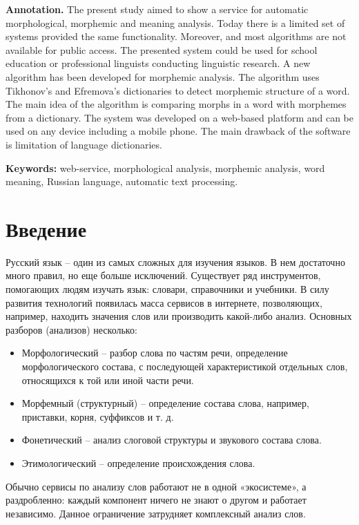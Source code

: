 \documentclass[a4paper,12pt]{article}
\begin{document}
\textbf{Annotation.} The present study aimed to show a service for automatic morphological, morphemic and meaning analysis. Today there is a limited set of systems provided the same functionality. Moreover, and most algorithms are not available for public access. The presented system could be used for school education or professional linguists conducting linguistic research. A new algorithm has been developed for morphemic analysis. The algorithm uses Tikhonov’s and Efremova’s dictionaries to detect morphemic structure of a word. The main idea of the algorithm is comparing morphs in a word with morphemes from a dictionary. The system was developed on a web-based platform and can be used on any device including a mobile phone. The main drawback of the software is limitation of language dictionaries.

\textbf{Keywords:} web-service, morphological analysis, morphemic analysis, word meaning, Russian language, automatic text processing.

\newpage

\section*{Введение}
Русский язык – один из самых сложных для изучения языков. В нем достаточно много правил, но еще больше исключений. Существует ряд инструментов, помогающих людям изучать язык: словари, справочники и учебники. В силу развития технологий появилась масса сервисов в интернете, позволяющих, например, находить значения слов или производить какой-либо анализ. Основных разборов (анализов) несколько:
\begin{itemize}
\item Морфологический – разбор слова по частям речи, определение морфологического состава, с последующей характеристикой отдельных слов, относящихся к той или иной части речи.
\item Морфемный (структурный) – определение состава слова, например, приставки, корня, суффиксов и т. д.
\item Фонетический – анализ слоговой структуры и звукового состава слова.
\item Этимологический – определение происхождения слова.
\end{itemize}

Обычно сервисы по анализу слов работают не в одной «экосистеме», а раздробленно: каждый компонент ничего не знают о другом и работает независимо. Данное ограничение затрудняет комплексный анализ слов.
\end{document}
